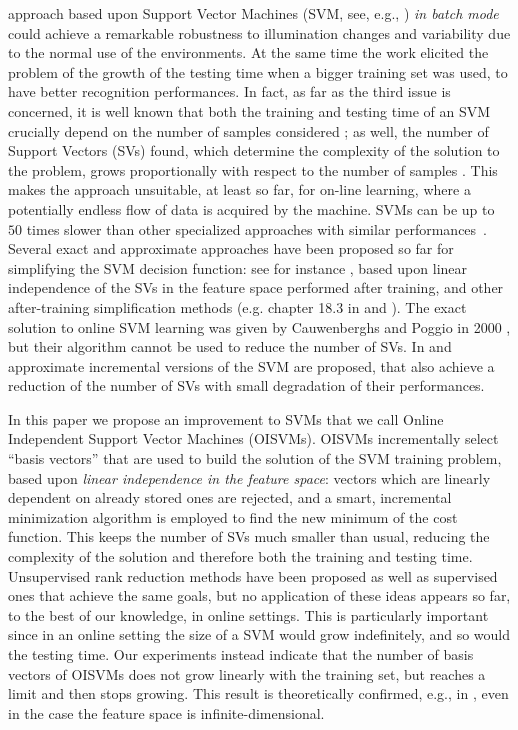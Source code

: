 approach based upon Support Vector Machines (SVM, see, e.g.,
\cite{BGV92}) \emph{in batch mode} could achieve a remarkable
robustness to illumination changes and variability due to the normal
use of the environments. At the same time the work elicited the
problem of the growth of the testing time when a bigger training set
was used, to have better recognition performances.  In fact, as far as
the third issue is concerned, it is well known that both the training
and testing time of an SVM crucially depend on the number of samples
considered \cite{KeerthiCDC06}; as well, the number of Support Vectors
(SVs) found, which determine the complexity of the solution to the
problem, grows proportionally with respect to the number of samples
\cite{Steinwart03}. This makes the approach unsuitable, at least so
far, for on-line learning, where a potentially endless flow of data is
acquired by the machine. SVMs can be up to $50$ times slower than
other specialized approaches with similar performances~\cite{BurgesS96}.
Several exact and approximate approaches have been proposed so
far for simplifying the SVM decision function: see for instance
\cite{DownsGM01}, based upon linear independence of the SVs in the
feature space performed after training, and other after-training
simplification methods (e.g.  chapter 18.3 in \cite{SmolaS02} and
\cite{nguyen2005}). The exact solution to online SVM learning was
given by Cauwenberghs and Poggio in 2000 \cite{CauwenberghsP00}, but
their algorithm cannot be used to reduce the number of SVs. In
\cite{syed99incremental} and \cite{pronobis:icvs06} approximate
incremental versions of the SVM are proposed, that also achieve a
reduction of the number of SVs with small degradation of their
performances.

In this paper we propose an improvement to SVMs that we call Online
Independent Support Vector Machines (OISVMs). OISVMs incrementally
select ``basis vectors'' that are used to build the solution of the
SVM training problem, based upon \emph{linear independence in the
feature space}: vectors which are linearly dependent on already stored
ones are rejected, and a smart, incremental minimization algorithm is
employed to find the new minimum of the cost function. This keeps the
number of SVs much smaller than usual, reducing the complexity of the
solution and therefore both the training and testing time. 
Unsupervised rank reduction methods have been proposed
\cite{Baudat03} as well as supervised ones \cite{BachJordan2005}
that achieve the same goals, but no application of these ideas appears
so far, to the best of our knowledge, in online settings. This is
particularly important since in an online setting the size of a SVM
would grow indefinitely, and so would the testing time. Our
experiments instead indicate that the number of basis vectors of
OISVMs does not grow linearly with the training set, but reaches a
limit and then stops growing. This result is theoretically confirmed,
e.g., in \cite{engel2004}, even in the case the feature space is
infinite-dimensional.

